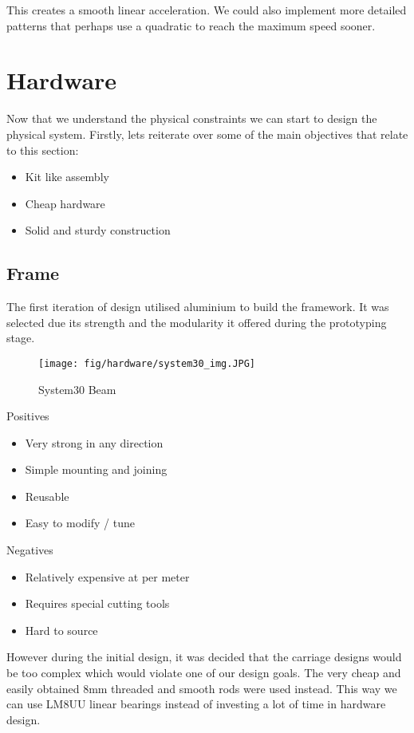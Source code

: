 \documentclass[a4paper, 11pt, twoside]{Thesis}  %
\begin{document}
This creates a smooth linear acceleration. We could also implement more detailed patterns that perhaps use a quadratic to reach the maximum speed sooner.
\chapter{Hardware}
\label{Hardware}

Now that we understand the physical constraints we can start to design the physical system. Firstly, lets reiterate over some of the main objectives that relate to this section:

\begin{itemize}
\item  Kit like assembly
\item  Cheap hardware
\item  Solid and sturdy construction
\end{itemize}

\section{Frame}

The first iteration of design utilised aluminium to build the framework. It was selected due its strength and the modularity it offered during the prototyping stage.

\begin{figure}[H]
\centering%
\texttt{[image: fig/hardware/system30\_img.JPG]}
\caption{System30 Beam}
\label{fig:system30_img.JPG}
\end{figure}
Positives
\begin{itemize}
\item  Very strong in any direction
\item  Simple mounting and joining
\item  Reusable
\item  Easy to modify / tune
\end{itemize}

Negatives
\begin{itemize}
\item  Relatively expensive at  per meter
\item  Requires special cutting tools
\item  Hard to source
\end{itemize}

However during the initial design, it was decided that the carriage designs would be too complex which would violate one of our design goals. The very cheap and easily obtained 8mm threaded and smooth rods were used instead. This way we can use LM8UU linear bearings instead of investing a lot of time in hardware design.
\end{document}
